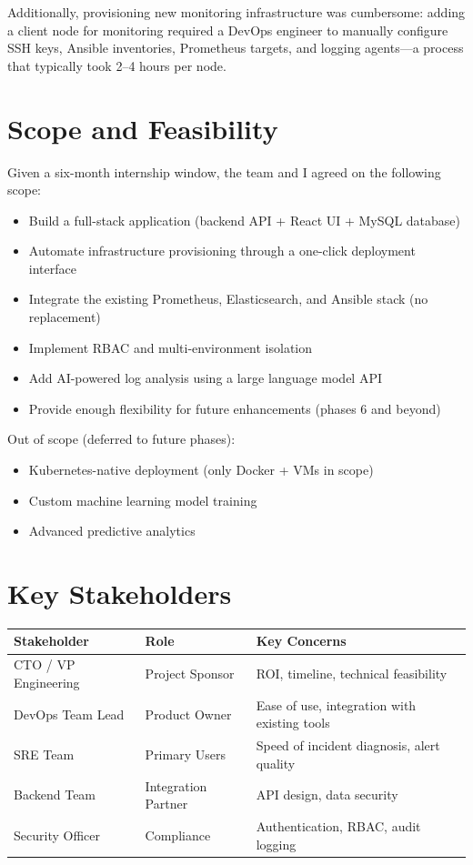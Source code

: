 \documentclass[12pt,a4paper]{report}
\begin{document}
Additionally, provisioning new monitoring infrastructure was cumbersome: adding a client node for monitoring required a DevOps engineer to manually configure SSH keys, Ansible inventories, Prometheus targets, and logging agents—a process that typically took 2–4 hours per node.

\section{Scope and Feasibility}

Given a six-month internship window, the team and I agreed on the following scope:

\begin{itemize}
  \item Build a full-stack application (backend API + React UI + MySQL database)
  \item Automate infrastructure provisioning through a one-click deployment interface
  \item Integrate the existing Prometheus, Elasticsearch, and Ansible stack (no replacement)
  \item Implement RBAC and multi-environment isolation
  \item Add AI-powered log analysis using a large language model API
  \item Provide enough flexibility for future enhancements (phases 6 and beyond)
\end{itemize}

Out of scope (deferred to future phases):
\begin{itemize}
  \item Kubernetes-native deployment (only Docker + VMs in scope)
  \item Custom machine learning model training
  \item Advanced predictive analytics
\end{itemize}

\section{Key Stakeholders}

\begin{center}
\begin{tabular}{|l|l|p{5cm}|}
  \hline
  \textbf{Stakeholder} & \textbf{Role} & \textbf{Key Concerns} \\
  \hline
  CTO / VP Engineering & Project Sponsor & ROI, timeline, technical feasibility \\
  \hline
  DevOps Team Lead & Product Owner & Ease of use, integration with existing tools \\
  \hline
  SRE Team & Primary Users & Speed of incident diagnosis, alert quality \\
  \hline
  Backend Team & Integration Partner & API design, data security \\
  \hline
  Security Officer & Compliance & Authentication, RBAC, audit logging \\
  \hline
\end{tabular}
\end{center}
\end{document}
